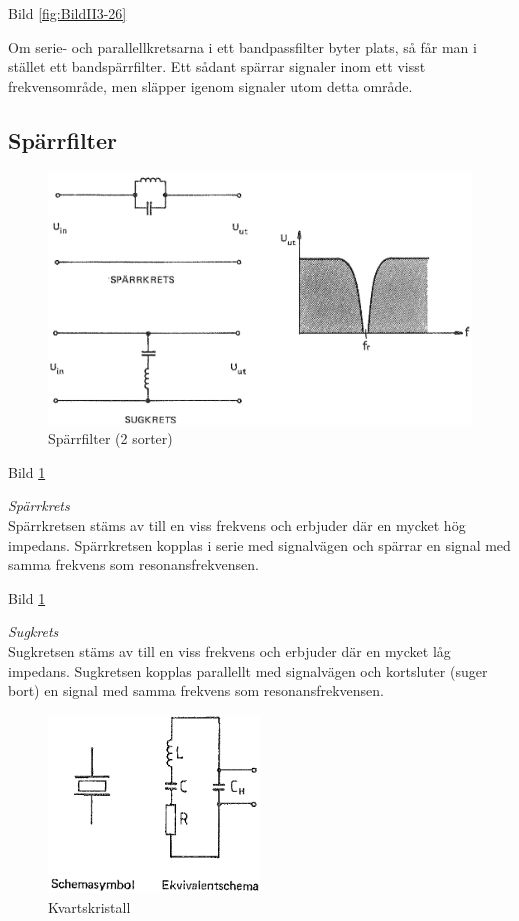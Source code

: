 Bild \ref{fig:BildII3-26}

Om serie- och parallellkretsarna i ett bandpassfilter byter plats, så får man
i stället ett bandspärrfilter. Ett sådant spärrar signaler inom ett visst
frekvensområde, men släpper igenom signaler utom detta område.

\subsection{Spärrfilter}

\begin{figure}
\includegraphics[width=\textwidth]{images/bild_2_3-27.png}
\caption{Spärrfilter (2 sorter)}
\label{fig:BildII3-27}
\end{figure}

Bild \ref{fig:BildII3-27}

\emph{Spärrkrets} \\
Spärrkretsen stäms av till en viss frekvens och erbjuder där en mycket hög
impedans. Spärrkretsen kopplas i serie med signalvägen och spärrar en signal
med samma frekvens som resonansfrekvensen.

Bild \ref{fig:BildII3-27}

\emph{Sugkrets} \\
Sugkretsen stäms av till en viss frekvens och erbjuder där en mycket låg
impedans. Sugkretsen kopplas parallellt med signalvägen och kortsluter (suger
bort) en signal med samma frekvens som resonansfrekvensen.

\begin{figure}
\includegraphics[width=0.5\textwidth]{images/bild_2_3-28.png}
\caption{Kvartskristall}
\label{fig:BildII3-28}
\end{figure}

